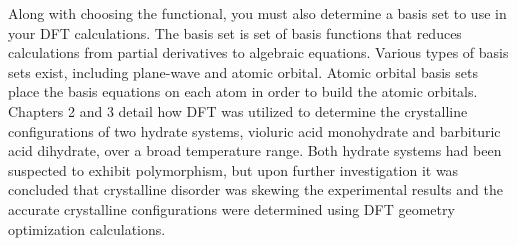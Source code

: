 Along with choosing the functional, you must also determine a basis set to use in your DFT calculations. The basis set is set of basis functions that reduces calculations from partial derivatives to algebraic equations. Various types of basis sets exist, including plane-wave and atomic orbital. Atomic orbital basis sets place the basis equations on each atom in order to build the atomic orbitals. 
Chapters 2 and 3 detail how DFT was utilized to determine the crystalline configurations of two hydrate systems, violuric acid monohydrate and barbituric acid dihydrate, over a broad temperature range. Both hydrate systems had been suspected to exhibit polymorphism, but upon further investigation it was concluded that crystalline disorder was skewing the experimental results and the accurate crystalline configurations were determined using DFT geometry optimization calculations. 

